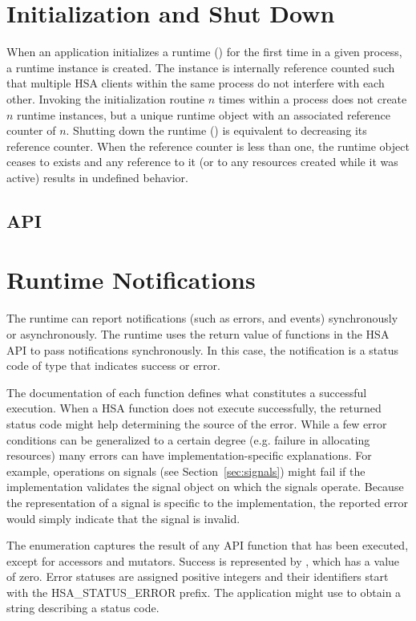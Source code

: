 \documentclass[final]{book}
\newcommand{\reftyp}[1]{#1}
\newcommand{\refenu}[1]{\reftyp{#1}}
\begin{document}
\section{Initialization and Shut Down}\label{sec:init}
When an application initializes a runtime () for the first time 
in a given process, a runtime instance is created. The instance is internally
reference counted such that multiple HSA clients within the same process do not
interfere with each other. Invoking the initialization routine $n$ times within
a process does not create $n$ runtime instances, but a unique runtime object
with an associated reference counter of $n$. Shutting down the runtime
() is equivalent to decreasing its reference counter. When
the reference counter is less than one, the runtime object ceases to exists and
any reference to it (or to any resources created while it was active) results in
undefined behavior.

\subsection{API}


\section{Runtime Notifications}
\label{sec:error}

The runtime can report notifications (such as errors, and events) synchronously 
or asynchronously. The runtime uses the return value of functions in the HSA API
to pass notifications synchronously. In this case, the notification is a status 
code of type  that indicates success or error.

The documentation of each function defines what constitutes a successful
execution. When a HSA function does not execute successfully, the returned
status code might help determining the source of the error. While a few error
conditions can be generalized to a certain degree (e.g. failure in allocating
resources) many errors can have implementation-specific explanations. For
example, operations on signals (see Section~\ref{sec:signals}) might
fail if the implementation validates the signal object on which the signals 
operate. Because the representation of a signal is specific to the 
implementation, the reported error would simply indicate that the signal is 
invalid.

The  enumeration captures the result of any API function
that has been executed, except for accessors and mutators. Success is
represented by , which has a value of zero. Error
statuses are assigned positive integers and their identifiers start with the
\refenu{HSA_STATUS_ERROR} prefix. The application might use
 to obtain a string describing a status code.
\end{document}
